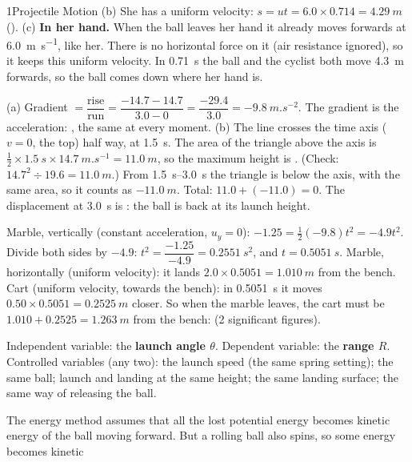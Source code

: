 \begin{chapteranswers}{1}{Projectile Motion}
        (b) She has a uniform velocity: $s = ut = 6.0 \times 0.714 = \qty{4.29}{m}$
        ().
        (c) \textbf{In her hand.} When the ball leaves her hand it already moves forwards at
        \qty{6.0}{m.s^{-1}}, like her. There is no horizontal force on it (air resistance
        ignored), so it keeps this uniform velocity. In \qty{0.71}{s} the ball and the cyclist
        both move \qty{4.3}{m} forwards, so the ball comes down where her hand is.
  \item (a) Gradient $= \dfrac{\text{rise}}{\text{run}} = \dfrac{-14.7 - 14.7}{3.0 - 0}
        = \dfrac{-29.4}{3.0} = \qty{-9.8}{m.s^{-2}}$. The gradient is the acceleration:
        , the same at every moment.
        (b) The line crosses the time axis ($v = 0$, the top) half way, at \qty{1.5}{s}. The
        area of the triangle above the axis is
        $\tfrac12 \times \qty{1.5}{s} \times \qty{14.7}{m.s^{-1}} = \qty{11.0}{m}$, so the
        maximum height is . (Check: $14.7^2 \div 19.6 = \qty{11.0}{m}$.)
        From \qtyrange{1.5}{3.0}{s} the triangle is below the axis, with the same area, so it
        counts as $-\qty{11.0}{m}$. Total: $11.0 + (-11.0) = 0$. The displacement at
        \qty{3.0}{s} is : the ball is back at its launch height.
  \item Marble, vertically (constant acceleration, $u_y = 0$):
        $-1.25 = \tfrac{1}{2}(-9.8)t^2 = -4.9t^2$. Divide both sides by $-4.9$:
        $t^2 = \dfrac{-1.25}{-4.9} = \qty{0.2551}{s^2}$, and
        $t = \qty{0.5051}{s}$.
        Marble, horizontally (uniform velocity): it lands $2.0 \times 0.5051 = \qty{1.010}{m}$
        from the bench.
        Cart (uniform velocity, towards the bench): in \qty{0.5051}{s} it moves
        $0.50 \times 0.5051 = \qty{0.2525}{m}$ closer.
        So when the marble leaves, the cart must be $1.010 + 0.2525 = \qty{1.263}{m}$ from the
        bench:  (2 significant figures).
  \item Independent variable: the \textbf{launch angle $\theta$}. Dependent variable: the
        \textbf{range $R$}. Controlled variables (any two): the launch speed (the same spring
        setting); the same ball; launch and landing at the same height; the same landing
        surface; the same way of releasing the ball.
  \item The energy method assumes that all the lost potential energy becomes kinetic energy of
        the ball moving forward. But a rolling ball also spins, so some energy becomes kinetic

\end{chapteranswers}
